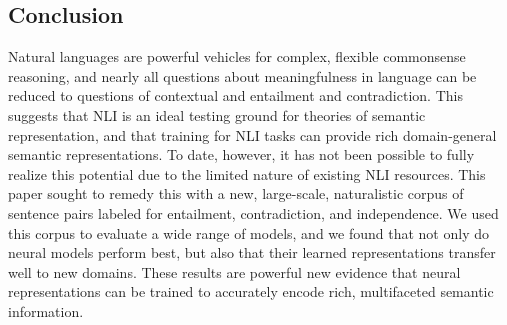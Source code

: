 \subsection{Conclusion}\label{sec:conclusion}

Natural languages are powerful vehicles for complex, flexible
commonsense reasoning, and nearly all questions about meaningfulness
in language can be reduced to questions of contextual and entailment
and contradiction. This suggests that NLI is an ideal testing ground
for theories of semantic representation, and that training for NLI
tasks can provide rich domain-general semantic representations.  To
date, however, it has not been possible to fully realize this
potential due to the limited nature of existing NLI resources.  This
paper sought to remedy this with a new, large-scale, naturalistic
corpus of sentence pairs labeled for entailment, contradiction, and
independence. We used this corpus to evaluate a wide range of models,
and we found that not only do neural models perform best, but also
that their learned representations transfer well to new domains.
These results are powerful new evidence that neural representations
can be trained to accurately encode rich, multifaceted semantic
information.

